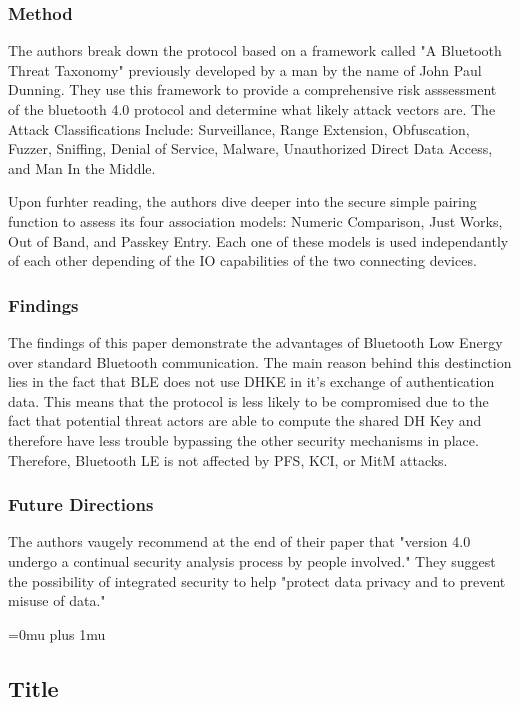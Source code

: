 \subsubsection{Method}

\noindent
The authors break down the protocol based on a framework called "A Bluetooth Threat Taxonomy" previously developed by a man by the name of John Paul Dunning. They use this framework to provide a comprehensive risk asssessment of the bluetooth 4.0 protocol and determine what likely attack vectors are. The Attack Classifications Include: Surveillance, Range Extension, Obfuscation, Fuzzer, Sniffing, Denial of Service, Malware, Unauthorized Direct Data Access, and Man In the Middle.

Upon furhter reading, the authors dive deeper into the secure simple pairing function to assess its four association models: Numeric Comparison, Just Works, Out of Band, and Passkey Entry. Each one of these models is used independantly of each other depending of the IO capabilities of the two connecting devices.

\subsubsection{Findings}

\noindent
The findings of this paper demonstrate the advantages of Bluetooth Low Energy over standard Bluetooth communication. The main reason behind this destinction lies in the fact that BLE does not use DHKE in it's exchange of authentication data. This means that the protocol is less likely to be compromised due to the fact that potential threat actors are able to compute the shared DH Key and therefore have less trouble bypassing the other security mechanisms in place. Therefore, Bluetooth LE is not affected by PFS, KCI, or MitM attacks.

\subsubsection{Future Directions}

\noindent
The authors vaugely recommend at the end of their paper that "version 4.0 undergo a continual security analysis process by people involved." They suggest the possibility of integrated security to help "protect data privacy and to prevent misuse of data."

\Urlmuskip=0mu plus 1mu\relax

\noindent
\subsection{Title}


